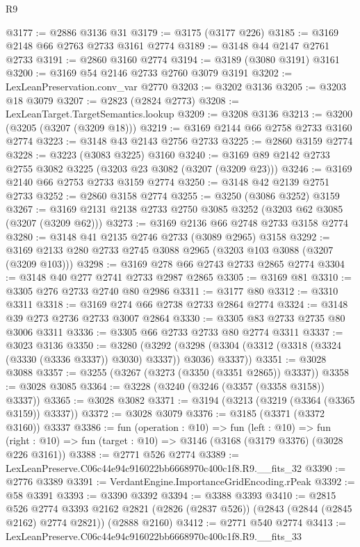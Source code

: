 \begin{lexlean}{R9}
\begin{coremodule}
@3177 := @2886 @3136 @31
@3179 := @3175 (@3177 @226)
@3185 := @3169 @2148 @66 @2763 @2733 @3161 @2774
@3189 := @3148 @44 @2147 @2761 @2733
@3191 := @2860 @3160 @2774
@3194 := @3189 (@3080 @3191) @3161
@3200 := @3169 @54 @2146 @2733 @2760 @3079 @3191
@3202 := LexLeanPreservation.conv_var @2770
@3203 := @3202 @3136
@3205 := @3203 @18 @3079
@3207 := @2823 (@2824 @2773)
@3208 := LexLeanTarget.TargetSemantics.lookup
@3209 := @3208 @3136
@3213 := @3200 (@3205 (@3207 (@3209 @18)))
@3219 := @3169 @2144 @66 @2758 @2733 @3160 @2774
@3223 := @3148 @43 @2143 @2756 @2733
@3225 := @2860 @3159 @2774
@3228 := @3223 (@3083 @3225) @3160
@3240 := @3169 @89 @2142 @2733 @2755 @3082 @3225 (@3203 @23 @3082 (@3207 (@3209 @23)))
@3246 := @3169 @2140 @66 @2753 @2733 @3159 @2774
@3250 := @3148 @42 @2139 @2751 @2733
@3252 := @2860 @3158 @2774
@3255 := @3250 (@3086 @3252) @3159
@3267 := @3169 @2131 @2138 @2733 @2750 @3085 @3252 (@3203 @62 @3085 (@3207 (@3209 @62)))
@3273 := @3169 @2136 @66 @2748 @2733 @3158 @2774
@3280 := @3148 @41 @2135 @2746 @2733 (@3089 @2965) @3158
@3292 := @3169 @2133 @280 @2733 @2745 @3088 @2965 (@3203 @103 @3088 (@3207 (@3209 @103)))
@3298 := @3169 @278 @66 @2743 @2733 @2865 @2774
@3304 := @3148 @40 @277 @2741 @2733 @2987 @2865
@3305 := @3169 @81
@3310 := @3305 @276 @2733 @2740 @80 @2986
@3311 := @3177 @80
@3312 := @3310 @3311
@3318 := @3169 @274 @66 @2738 @2733 @2864 @2774
@3324 := @3148 @39 @273 @2736 @2733 @3007 @2864
@3330 := @3305 @83 @2733 @2735 @80 @3006 @3311
@3336 := @3305 @66 @2733 @2733 @80 @2774 @3311
@3337 := @3023 @3136
@3350 := @3280
    (@3292 (@3298 (@3304 (@3312 (@3318 (@3324 (@3330 (@3336 @3337)) @3030) @3337)) @3036) @3337))
@3351 := @3028 @3088
@3357 := @3255 (@3267 (@3273 (@3350 (@3351 @2865)) @3337))
@3358 := @3028 @3085
@3364 := @3228 (@3240 (@3246 (@3357 (@3358 @3158)) @3337))
@3365 := @3028 @3082
@3371 := @3194 (@3213 (@3219 (@3364 (@3365 @3159)) @3337))
@3372 := @3028 @3079
@3376 := @3185 (@3371 (@3372 @3160)) @3337
@3386 := fun (operation : @10) =>
  fun (left : @10) =>
  fun (right : @10) => fun (target : @10) => @3146 (@3168 (@3179 @3376) (@3028 @226 @3161))
@3388 := @2771 @526 @2774
@3389 := LexLeanPreserve.C06c44e94c916022bb6668970c400c1f8.R9.__fits_32
@3390 := @2776 @3389
@3391 := VerdantEngine.ImportanceGridEncoding.rPeak
@3392 := @58 @3391
@3393 := @3390 @3392
@3394 := @3388 @3393
@3410 := @2815
    @526
    @2774
    @3393
    @2162
    @2821
    (@2826 (@2837 @526))
    (@2843 (@2844 (@2845 @2162) @2774 @2821))
    (@2888 @2160)
@3412 := @2771 @540 @2774
@3413 := LexLeanPreserve.C06c44e94c916022bb6668970c400c1f8.R9.__fits_33

\end{coremodule}
\end{lexlean}
